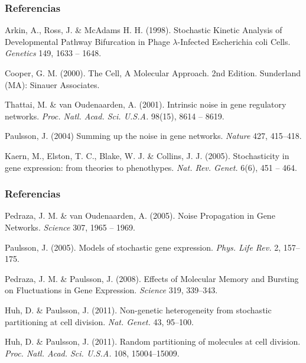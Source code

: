 \documentclass{beamer}
\begin{document}
\footnotesize{
\begin{frame}
\frametitle{Referencias}
\begin{thebibliography}{99}

 Arkin, A., Ross, J. \& McAdams H. H. (1998).
\newblock Stochastic Kinetic Analysis of Developmental Pathway Bifurcation in Phage $\lambda$-Infected Escherichia coli Cells.
\newblock \emph{Genetics} 149, 1633 -- 1648.

 Cooper, G. M. (2000).
\newblock The Cell, A Molecular Approach. 2nd Edition.
\newblock Sunderland (MA): Sinauer Associates.

 Thattai, M. \& van Oudenaarden, A. (2001).
\newblock Intrinsic noise in gene regulatory networks.
\newblock \emph{Proc. Natl. Acad. Sci. U.S.A.} 98(15), 8614 -- 8619.

 Paulsson, J. (2004)
\newblock Summing up the noise in gene networks.
\newblock \emph{Nature} 427, 415--418.

 Kaern, M., Elston, T. C., Blake, W. J. \& Collins, J. J. (2005).
\newblock Stochasticity in gene expression: from theories to phenothypes.
\newblock \emph{Nat. Rev. Genet.} 6(6), 451 -- 464.

\end{thebibliography}
\end{frame}

\begin{frame}
\frametitle{Referencias}
\begin{thebibliography}{99}

 Pedraza, J. M. \& van Oudenaarden, A. (2005).
\newblock Noise Propagation in Gene Networks.
\newblock \emph{Science} 307, 1965 -- 1969.

 Paulsson, J. (2005).
\newblock Models of stochastic gene expression.
\newblock \emph{Phys. Life Rev.} 2, 157--175.

 Pedraza, J. M. \& Paulsson, J. (2008).
\newblock Effects of Molecular Memory and Bursting on Fluctuations in Gene Expression.
\newblock \emph{Science} 319, 339--343.

 Huh, D. \& Paulsson, J. (2011).
\newblock Non-genetic heterogeneity from stochastic partitioning at cell division.
\newblock \emph{Nat. Genet.} 43, 95--100.

 Huh, D. \& Paulsson, J. (2011).
\newblock Random partitioning of molecules at cell division.
\newblock \emph{Proc. Natl. Acad. Sci. U.S.A.} 108, 15004--15009.
\end{thebibliography}
\end{frame}
}
\end{document}
